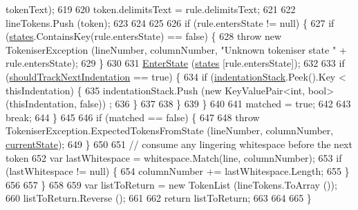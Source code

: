 \begin{DoxyCode}
      tokenText);
619 
620                     token.delimitsText = rule.delimitsText;
621 
622                     lineTokens.Push (token);
623 
624 
625 
626                     \textcolor{keywordflow}{if} (rule.entersState != null) \{
627                         \textcolor{keywordflow}{if} (\hyperlink{a00101_a2c65c0ba90f973e459583badefef216a}{states}.ContainsKey(rule.entersState) == \textcolor{keyword}{false}) \{
628                             \textcolor{keywordflow}{throw} \textcolor{keyword}{new} TokeniserException (lineNumber, columnNumber, \textcolor{stringliteral}{"Unknown tokeniser
       state "} + rule.entersState);
629                         \}
630 
631                         \hyperlink{a00101_ad3ef08f822b310d9864774b057b96995}{EnterState} (\hyperlink{a00101_a2c65c0ba90f973e459583badefef216a}{states} [rule.entersState]);
632 
633                         \textcolor{keywordflow}{if} (\hyperlink{a00101_ac670aac2245cbd4694dfbd5b69313218}{shouldTrackNextIndentation} == \textcolor{keyword}{true}) \{
634                             \textcolor{keywordflow}{if} (\hyperlink{a00101_a6631a1b1a9109258ab18927e7587ff9b}{indentationStack}.Peek().Key < thisIndentation) \{
635                                 indentationStack.Push (\textcolor{keyword}{new} KeyValuePair<int, bool>(thisIndentation, \textcolor{keyword}{false}))
      ;
636                             \}
637                                 
638                         \}
639                     \}
640 
641                     matched = \textcolor{keyword}{true};
642 
643                     \textcolor{keywordflow}{break};
644                 \}
645 
646                 \textcolor{keywordflow}{if} (matched == \textcolor{keyword}{false}) \{
647 
648                     \textcolor{keywordflow}{throw} TokeniserException.ExpectedTokensFromState (lineNumber, columnNumber, 
      \hyperlink{a00101_ac90b7dce8103425a148f9e8588f14137}{currentState});
649                 \}
650 
651                 \textcolor{comment}{// consume any lingering whitespace before the next token}
652                 var lastWhitespace = whitespace.Match(line, columnNumber);
653                 \textcolor{keywordflow}{if} (lastWhitespace != null) \{
654                     columnNumber += lastWhitespace.Length;
655                 \}
656 
657             \}
658 
659             var listToReturn = \textcolor{keyword}{new} TokenList (lineTokens.ToArray ());
660             listToReturn.Reverse ();
661 
662             \textcolor{keywordflow}{return} listToReturn;
663 
664 
665         \}
\end{DoxyCode}


